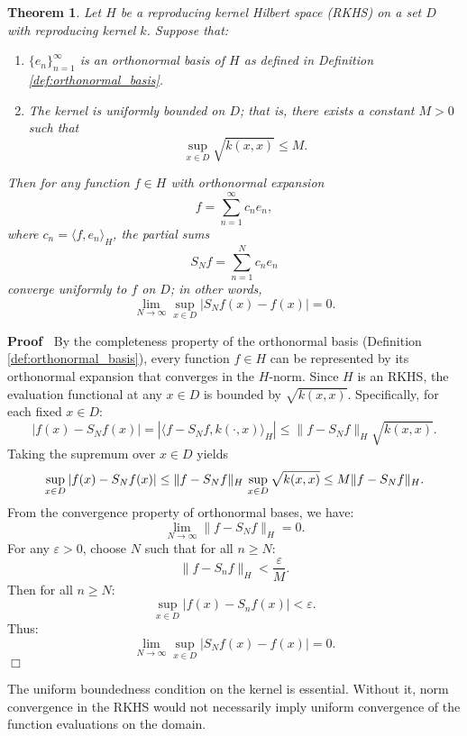 \documentclass{article}
\newcommand{\nobracket}{}
\newenvironment{proof}{\noindent\textbf{Proof\ }}{\hspace*{\fill}$\Box$\medskip}
\newtheorem{theorem}{Theorem}
\begin{document}
\begin{theorem}
  \label{thm:uniform_convergence}Let $H$ be a reproducing kernel Hilbert space
  (RKHS) on a set $D$ with reproducing kernel $k$. Suppose that:
  \begin{enumerate}
    \item $\{e_n \}_{n = 1}^{\infty}$ is an orthonormal basis of $H$ as
    defined in Definition \ref{def:orthonormal_basis}.
    
    \item The kernel is uniformly bounded on $D$; that is, there exists a
    constant $M > 0$ such that
    \[ \sup_{x \in D}  \sqrt{k (x, x)} \le M. \]
  \end{enumerate}
  Then for any function $f \in H$ with orthonormal expansion
  \[ f = \sum_{n = 1}^{\infty} c_n e_n, \]
  where $c_n = \langle f, e_n \rangle_H$, the partial sums
  \[ S_N f = \sum_{n = 1}^N c_n e_n \]
  converge uniformly to $f$ on $D$; in other words,
  \[ \lim_{N \to \infty} \sup_{x \in D} | S_N f (x) - f (x) | = 0. \]
\end{theorem}

\begin{proof}
  By the completeness property of the orthonormal basis (Definition
  \ref{def:orthonormal_basis}), every function $f \in H$ can be represented by
  its orthonormal expansion that converges in the $H$-norm. Since $H$ is an
  RKHS, the evaluation functional at any $x \in D$ is bounded by $\sqrt{k (x,
  x)}$. Specifically, for each fixed $x \in D$:
  \[ \nobracket | f (x) - S_N f (x) | = | \langle f - S_N f, k (\cdot, x)
     \rangle_H | \le \|f - S_N f\|_H  \sqrt{k (x, x)} . \]
  Taking the supremum over $x \in D$ yields
  \[ \sup_{x \in D} | f (x) - S_N f (x) | \le \|f - S_N f\|_H  \hspace{0.17em}
     \sup_{x \in D}  \sqrt{k (x, x)} \le M \|f - S_N f\|_H . \]
  From the convergence property of orthonormal bases, we have:
  \[ \lim_{N \to \infty} \|f - S_N f\|_H = 0. \]
  For any $\varepsilon > 0$, choose $N$ such that for all $n \ge N$:
  \[ \|f - S_n f\|_H < \frac{\varepsilon}{M} . \]
  Then for all $n \ge N$:
  \[ \sup_{x \in D} | f (x) - S_n f (x) | < \varepsilon . \]
  Thus:
  \[ \lim_{N \to \infty} \sup_{x \in D} |S_N f (x) - f (x) | = 0. \]
\end{proof}

\begin{remark}
  The uniform boundedness condition on the kernel is essential. Without it,
  norm convergence in the RKHS would not necessarily imply uniform convergence
  of the function evaluations on the domain.
\end{remark}
\end{document}
